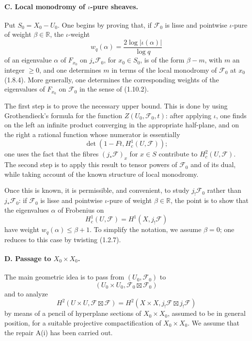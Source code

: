 \documentclass[11pt]{article}
\theoremstyle{remark}
\begin{document}
\paragraph{C. Local monodromy of $\iota$-pure sheaves.}
Put $S_0=X_0-U_0$. One begins by proving that, if $\mathcal F_0$ is lisse and pointwise $\iota$-pure of weight $\beta\in\mathbb R$, the $\iota$-weight
\[
w_q(\alpha)=\frac{2\log |\iota(\alpha)|}{\log q}
\]
of an eigenvalue $\alpha$ of $F_{x_0}$ on $j_{*}\mathcal F_0$, for $x_0\in S_0$, is of the form $\beta-m$, with $m$ an integer $\ge 0$, and one determines $m$ in terms of the local monodromy of $\mathcal F_0$ at $x_0$ (1.8.4). More generally, one determines the corresponding weights of the eigenvalues of $F_{x_0}$ on $\mathcal F_0$ in the sense of (1.10.2).

The first step is to prove the necessary upper bound. This is done by using Grothendieck's formula for the function $Z(U_0,\mathcal F_0,t)$: after applying $\iota$, one finds on the left an infinite product converging in the appropriate half-plane, and on the right a rational function whose numerator is essentially
\[
\det(1-Ft,H^1_c(U,\mathcal F));
\]
one uses the fact that the fibres $(j_{*}\mathcal F)_x$ for $x\in S$ contribute to $H^2_c(U,\mathcal F)$. The second step is to apply this result to tensor powers of $\mathcal F_0$ and of its dual, while taking account of the known structure of local monodromy.

Once this is known, it is permissible, and convenient, to study $j_{!}\mathcal F_0$ rather than $j_{*}\mathcal F_0$: if $\mathcal F_0$ is lisse and pointwise $\iota$-pure of weight $\beta\in\mathbb R$, the point is to show that the eigenvalues $\alpha$ of Frobenius on
\[
H^1_c(U,\mathcal F)=H^1(X,j_{!}\mathcal F)
\]
have weight $w_q(\alpha)\le \beta+1$. To simplify the notation, we assume $\beta=0$; one reduces to this case by twisting (1.2.7).

\paragraph{D. Passage to $X_0\times X_0$.}
The main geometric idea is to pass from $(U_0,\mathcal F_0)$ to
\[
(U_0\times U_0,\mathcal F_0\boxtimes\mathcal F_0)
\]
and to analyze
\[
H^2(U\times U,\mathcal F\boxtimes\mathcal F)
  = H^2(X\times X,j_{!}\mathcal F\boxtimes j_{!}\mathcal F)
\]
by means of a pencil of hyperplane sections of $X_0\times X_0$, assumed to be in general position, for a suitable projective compactification of $X_0\times X_0$. We assume that the repair A(i) has been carried out.
\end{document}
